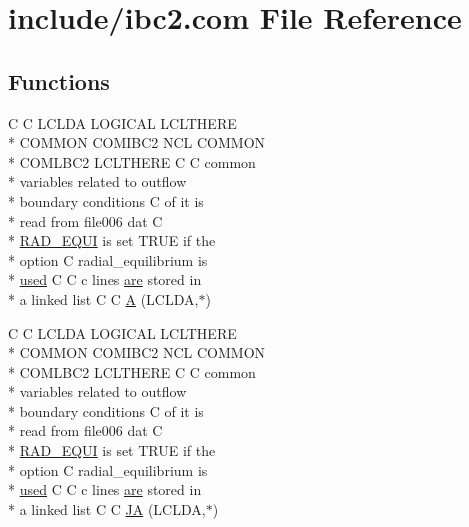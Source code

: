 \hypertarget{ibc2_8com}{\section{include/ibc2.com File Reference}
\label{ibc2_8com}
}
\subsection*{Functions}
\begin{DoxyCompactItemize}
\item 
C C L\-C\-L\-D\-A L\-O\-G\-I\-C\-A\-L L\-C\-L\-T\-H\-E\-R\-E \\*
C\-O\-M\-M\-O\-N C\-O\-M\-I\-B\-C2 N\-C\-L C\-O\-M\-M\-O\-N \\*
C\-O\-M\-L\-B\-C2 L\-C\-L\-T\-H\-E\-R\-E C C common \\*
variables related to outflow \\*
boundary conditions C of it is \\*
read from file006 dat C \\*
\hyperlink{ibc2_8com_a5e52771773c3d7155ccec9942c9d7d87}{R\-A\-D\-\_\-\-E\-Q\-U\-I} is set T\-R\-U\-E if the \\*
option C radial\-\_\-equilibrium is \\*
\hyperlink{streamplasma_8com_ae33ecc71599b4338146f31d68e60c328}{used} C C c lines \hyperlink{ibc8_8com_a7f7721a0bb3c1d35cfbfbcfd6efc1548}{are} stored in \\*
a linked list C C \hyperlink{ibc2_8com_ad2108d58343608772fff791c23da58f5}{A} (L\-C\-L\-D\-A,$\ast$)
\item 
C C L\-C\-L\-D\-A L\-O\-G\-I\-C\-A\-L L\-C\-L\-T\-H\-E\-R\-E \\*
C\-O\-M\-M\-O\-N C\-O\-M\-I\-B\-C2 N\-C\-L C\-O\-M\-M\-O\-N \\*
C\-O\-M\-L\-B\-C2 L\-C\-L\-T\-H\-E\-R\-E C C common \\*
variables related to outflow \\*
boundary conditions C of it is \\*
read from file006 dat C \\*
\hyperlink{ibc2_8com_a5e52771773c3d7155ccec9942c9d7d87}{R\-A\-D\-\_\-\-E\-Q\-U\-I} is set T\-R\-U\-E if the \\*
option C radial\-\_\-equilibrium is \\*
\hyperlink{streamplasma_8com_ae33ecc71599b4338146f31d68e60c328}{used} C C c lines \hyperlink{ibc8_8com_a7f7721a0bb3c1d35cfbfbcfd6efc1548}{are} stored in \\*
a linked list C C \hyperlink{ibc2_8com_af199d7d60a8f42163bb27e1d8108fedb}{J\-A} (L\-C\-L\-D\-A,$\ast$)
\end{DoxyCompactItemize}
